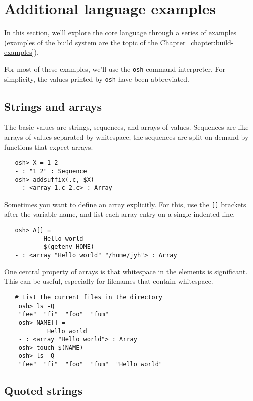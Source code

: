 %
%
\chapter{Additional language examples}
\label{chapter:language-examples}

In this section, we'll explore the core language through a series of examples (examples of the build
system are the topic of the Chapter~\ref{chapter:build-examples}).

For most of these examples, we'll use the \verb+osh+ command interpreter.  For simplicity, the
values printed by \verb+osh+ have been abbreviated.

\section{Strings and arrays}

The basic \OMake{} values are strings, sequences, and arrays of values.  Sequences are like arrays of
values separated by whitespace; the sequences are split on demand by functions that expect arrays.

\begin{verbatim}
   osh> X = 1 2
   - : "1 2" : Sequence
   osh> addsuffix(.c, $X)
   - : <array 1.c 2.c> : Array
\end{verbatim}

Sometimes you want to define an array explicitly.  For this, use the \verb+[]+ brackets after the
variable name, and list each array entry on a single indented line.

\begin{verbatim}
   osh> A[] =
           Hello world
           $(getenv HOME)
   - : <array "Hello world" "/home/jyh"> : Array
\end{verbatim}

One central property of arrays is that whitespace in the elements is significant.  This can be
useful, especially for filenames that contain whitespace. 

\begin{verbatim}
   # List the current files in the directory
    osh> ls -Q
    "fee"  "fi"  "foo"  "fum"
    osh> NAME[] = 
            Hello world
    - : <array "Hello world"> : Array
    osh> touch $(NAME)
    osh> ls -Q
    "fee"  "fi"  "foo"  "fum"  "Hello world"
\end{verbatim}     

\section{Quoted strings}
\label{section:quoted-strings}

